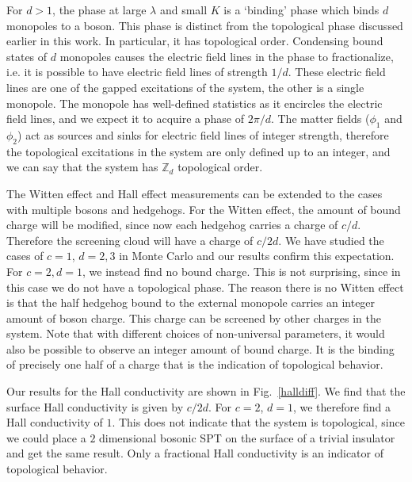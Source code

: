 \documentclass[prb,twocolumn]{revtex4-1}
\begin{document}
For $d>1$, the phase at large $\lambda$ and small $K$ is a `binding' phase which binds $d$ monopoles to a boson. This phase is distinct from the topological phase discussed earlier in this work. In particular, it has topological order. Condensing bound states of $d$ monopoles causes the electric field lines in the phase to fractionalize, i.e. it is possible to have electric field lines of strength $1/d$. These electric field lines are one of the gapped excitations of the system, the other is a single monopole. The monopole has well-defined statistics as it encircles the electric field lines, and we expect it to acquire a phase of $2\pi/d$. The matter fields ($\phi_1$ and $\phi_2$) act as sources and sinks for electric field lines of integer strength, therefore the topological excitations in the system are only defined up to an integer, and we can say that the system has $\mathbb{Z}_d$ topological order.


The Witten effect and Hall effect measurements can be extended to the cases with multiple bosons and hedgehogs. For the Witten effect, the amount of bound charge will be modified, since now each hedgehog carries a charge of $c/d$. Therefore the screening cloud will have a charge of $c/2d$. We have studied the cases of $c=1$, $d=2,3$ in Monte Carlo and our results confirm this expectation. For $c=2,d=1$, we instead find no bound charge. This is not surprising, since in this case we do not have a topological phase. The reason there is no Witten effect is that the half hedgehog bound to the external monopole carries an integer amount of boson charge. This charge can be screened by other charges in the system. Note that with different choices of non-universal parameters, it would also be possible to observe an integer amount of bound charge. It is the binding of precisely one half of a charge that is the indication of topological behavior.

Our results for the Hall conductivity are shown in Fig.~\ref{halldiff}. We find that the surface Hall conductivity is given by $c/2d$. For $c=2$, $d=1$, we therefore find a Hall conductivity of $1$. This does not indicate that the system is topological, since we could place a $2$ dimensional bosonic SPT on the surface of a trivial insulator and get the same result. Only a fractional Hall conductivity is an indicator of topological behavior. 
\end{document}
